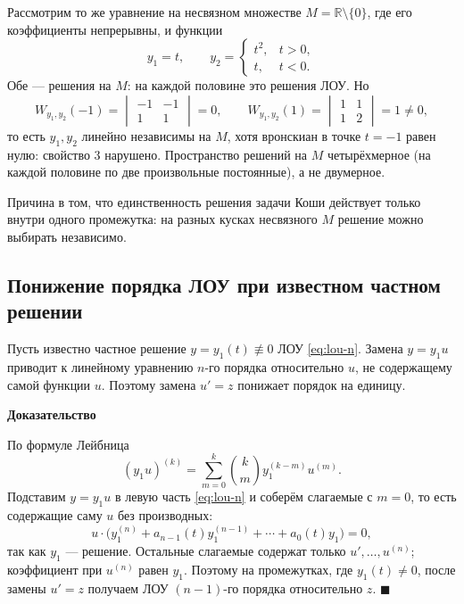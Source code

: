 \documentclass[12pt,a4paper]{article}
\numberwithin{equation}{section}
\newcommand{\R}{\mathbb{R}}
\renewenvironment{proof}[1][Доказательство]{\begin{center}\textbf{#1}\end{center}}{\hfill$\blacksquare$\par}
\begin{document}
\begin{remarkHSE}
Рассмотрим то же уравнение на несвязном множестве \(M=\R\setminus\{0\}\), где его коэффициенты непрерывны, и функции
\[
y_1=t,\qquad
y_2=\begin{cases}t^2,&t>0,\\ t,&t<0.\end{cases}
\]
Обе --- решения на \(M\): на каждой половине это решения ЛОУ. Но
\[
W_{y_1,y_2}(-1)=\begin{vmatrix}-1&-1\\1&1\end{vmatrix}=0,\qquad
W_{y_1,y_2}(1)=\begin{vmatrix}1&1\\1&2\end{vmatrix}=1\neq0,
\]
то есть \(y_1,y_2\) линейно независимы на \(M\), хотя вронскиан в точке \(t=-1\) равен нулю: свойство 3 нарушено. Пространство решений на \(M\) четырёхмерное (на каждой половине по две произвольные постоянные), а не двумерное.

Причина в том, что единственность решения задачи Коши действует только внутри одного промежутка: на разных кусках несвязного \(M\) решение можно выбирать независимо.
\end{remarkHSE}

\subsection[Понижение порядка ЛОУ]{Понижение порядка ЛОУ при известном частном решении}

\begin{theoremHSE}
Пусть известно частное решение \(y=y_1(t)\not\equiv0\) ЛОУ \eqref{eq:lou-n}. Замена \(y=y_1u\) приводит к линейному уравнению \(n\)-го порядка относительно \(u\), не содержащему самой функции \(u\). Поэтому замена \(u'=z\) понижает порядок на единицу.
\end{theoremHSE}

\begin{proof}
По формуле Лейбница
\[
(y_1u)^{(k)}=\sum_{m=0}^{k}\binom{k}{m}y_1^{(k-m)}u^{(m)}.
\]
Подставим \(y=y_1u\) в левую часть \eqref{eq:lou-n} и соберём слагаемые с \(m=0\), то есть содержащие саму \(u\) без производных:
\[
u\cdot\bigl(y_1^{(n)}+a_{n-1}(t)y_1^{(n-1)}+\cdots+a_0(t)y_1\bigr)=0,
\]
так как \(y_1\) --- решение. Остальные слагаемые содержат только \(u',\ldots,u^{(n)}\); коэффициент при \(u^{(n)}\) равен \(y_1\). Поэтому на промежутках, где \(y_1(t)\neq0\), после замены \(u'=z\) получаем ЛОУ \((n-1)\)-го порядка относительно \(z\).
\end{proof}
\end{document}
